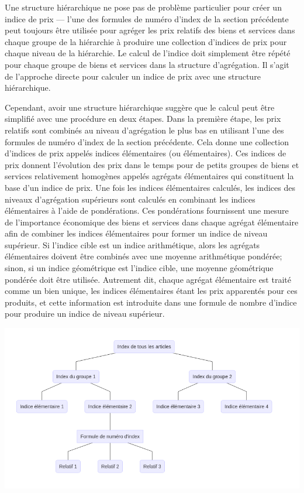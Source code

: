 \documentclass[
]{article}
\begin{document}
Une structure hiérarchique ne pose pas de problème particulier pour créer un indice de prix --- l'une des formules de numéro d'index de la section précédente peut toujours être utilisée pour agréger les prix relatifs des biens et services dans chaque groupe de la hiérarchie à produire une collection d'indices de prix pour chaque niveau de la hiérarchie. Le calcul de l'indice doit simplement être répété pour chaque groupe de biens et services dans la structure d'agrégation. Il s'agit de l'approche directe pour calculer un indice de prix avec une structure hiérarchique.

Cependant, avoir une structure hiérarchique suggère que le calcul peut être simplifié avec une procédure en deux étapes. Dans la première étape, les prix relatifs sont combinés au niveau d'agrégation le plus bas en utilisant l'une des formules de numéro d'index de la section précédente. Cela donne une collection d'indices de prix appelés indices élémentaires (ou élémentaires). Ces indices de prix donnent l'évolution des prix dans le temps pour de petits groupes de biens et services relativement homogènes appelés agrégats élémentaires qui constituent la base d'un indice de prix. Une fois les indices élémentaires calculés, les indices des niveaux d'agrégation supérieurs sont calculés en combinant les indices élémentaires à l'aide de pondérations. Ces pondérations fournissent une mesure de l'importance économique des biens et services dans chaque agrégat élémentaire afin de combiner les indices élémentaires pour former un indice de niveau supérieur. Si l'indice cible est un indice arithmétique, alors les agrégats élémentaires doivent être combinés avec une moyenne arithmétique pondérée; sinon, si un indice géométrique est l'indice cible, une moyenne géométrique pondérée doit être utilisée. Autrement dit, chaque agrégat élémentaire est traité comme un bien unique, les indices élémentaires étant les prix apparentés pour ces produits, et cette information est introduite dans une formule de nombre d'indice pour produire un indice de niveau supérieur.

\includegraphics{img/plot2.png}
\end{document}
